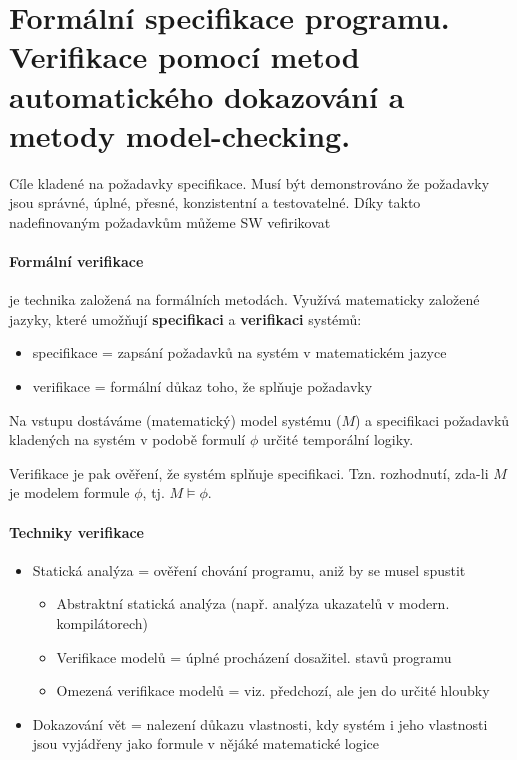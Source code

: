 \section[TVS - Formální specifikace programu, model checking]{Formální specifikace programu. Verifikace pomocí metod automatického dokazování a metody model-checking.}

Cíle kladené na požadavky specifikace. Musí být demonstrováno že požadavky jsou správné, úplné, přesné, konzistentní a testovatelné. Díky takto nadefinovaným požadavkům můžeme SW vefirikovat

\paragraph{Formální verifikace} je technika založená na formálních metodách. Využívá matematicky založené jazyky, které umožňují \textbf{specifikaci} a \textbf{verifikaci} systémů:
\begin{itemize}[itemsep=0px]
\item specifikace = zapsání požadavků na systém v matematickém jazyce
\item verifikace = formální důkaz toho, že splňuje požadavky
\end{itemize}

Na vstupu dostáváme (matematický) model systému ($M$) a specifikaci požadavků kladených na systém v podobě formulí $\phi$ určité temporální logiky.

Verifikace je pak ověření, že systém splňuje specifikaci. Tzn. rozhodnutí, zda-li $M$ je modelem formule $\phi$, tj. $M \models \phi$.

\paragraph{Techniky verifikace}
\begin{itemize}[itemsep=0px]
\item Statická analýza = ověření chování programu, aniž by se musel spustit
    \begin{itemize}[itemsep=0px]
    \item Abstraktní statická analýza (např. analýza ukazatelů v modern. kompilátorech)
    \item Verifikace modelů = úplné procházení dosažitel. stavů programu
    \item Omezená verifikace modelů = viz. předchozí, ale jen do určité hloubky
    \end{itemize}
\item Dokazování vět = nalezení důkazu vlastnosti, kdy systém i jeho vlastnosti jsou vyjádřeny jako formule v nějáké matematické logice
\end{itemize}

